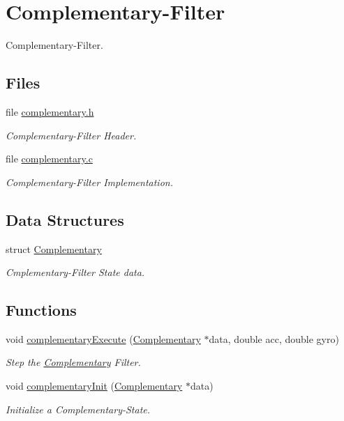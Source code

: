 \hypertarget{group__complementary}{\section{Complementary-\/\-Filter}
\label{group__complementary}
}


Complementary-\/\-Filter.  


\subsection*{Files}
\begin{DoxyCompactItemize}
\item 
file \hyperlink{complementary_8h}{complementary.\-h}
\begin{DoxyCompactList}\small\item\em Complementary-\/\-Filter Header. \end{DoxyCompactList}\item 
file \hyperlink{complementary_8c}{complementary.\-c}
\begin{DoxyCompactList}\small\item\em Complementary-\/\-Filter Implementation. \end{DoxyCompactList}\end{DoxyCompactItemize}
\subsection*{Data Structures}
\begin{DoxyCompactItemize}
\item 
struct \hyperlink{struct_complementary}{Complementary}
\begin{DoxyCompactList}\small\item\em Cmplementary-\/\-Filter State data. \end{DoxyCompactList}\end{DoxyCompactItemize}
\subsection*{Functions}
\begin{DoxyCompactItemize}
\item 
void \hyperlink{group__complementary_gaa0b82ecce955806245736b228e0702d2}{complementary\-Execute} (\hyperlink{struct_complementary}{Complementary} $\ast$data, double acc, double gyro)
\begin{DoxyCompactList}\small\item\em Step the \hyperlink{struct_complementary}{Complementary} Filter. \end{DoxyCompactList}\item 
void \hyperlink{group__complementary_ga0e47610c4ee9fab65271c599db6cc24b}{complementary\-Init} (\hyperlink{struct_complementary}{Complementary} $\ast$data)
\begin{DoxyCompactList}\small\item\em Initialize a Complementary-\/\-State. \end{DoxyCompactList}\end{DoxyCompactItemize}


